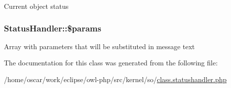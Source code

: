 Current object status \hypertarget{classStatusHandler_599f9c9284340399fdcb7dac9cb7856f}{
\subsubsection{\setlength{\rightskip}{0pt plus 5cm}StatusHandler::\$params}}
\label{classStatusHandler_599f9c9284340399fdcb7dac9cb7856f}


Array with parameters that will be substituted in message text 

The documentation for this class was generated from the following file:\begin{CompactItemize}
\item 
/home/oscar/work/eclipse/owl-php/src/kernel/so/\hyperlink{class_8statushandler_8php}{class.statushandler.php}\end{CompactItemize}

